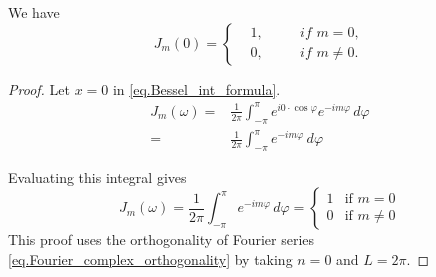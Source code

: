 \begin{lemma}[] We have
\begin{equation}\label{eq.Bessel_value_at_zero}
    J_m(0) = \left\{\begin{aligned}
    &1,\quad &&\textit{if } m = 0,
    \\
    &0, &&\textit{if } m \neq 0.
\end{aligned}
\right.
\end{equation}
\end{lemma}
\begin{proof}
Let $x = 0$ in \eqref{eq.Bessel_int_formula}. 
\begin{equation}\label{eq.proof_Bessel_value_at_zero_1}
    \begin{split}
    J_m(\omega) =& \frac{1}{2\pi} \int_{-\pi}^{\pi} e^{i0 \cdot \cos \varphi} e^{-im \varphi} \, d\varphi
    \\
    =& \frac{1}{2\pi} \int_{-\pi}^{\pi} e^{-im \varphi} \, d\varphi
    \end{split}
\end{equation}

Evaluating this integral gives
\begin{equation}\label{eq.proof_Bessel_value_at_zero_2}
    J_m(\omega)=\frac{1}{2\pi} \int_{-\pi}^{\pi} e^{-im \varphi} \, d\varphi= 
    \begin{cases} 
    1 & \text{if } m = 0 \\ 
    0 & \text{if } m \neq 0 
    \end{cases}
\end{equation}
This proof uses the orthogonality of Fourier series \eqref{eq.Fourier_complex_orthogonality} by taking $n = 0$ and $L = 2\pi$.
\end{proof}

